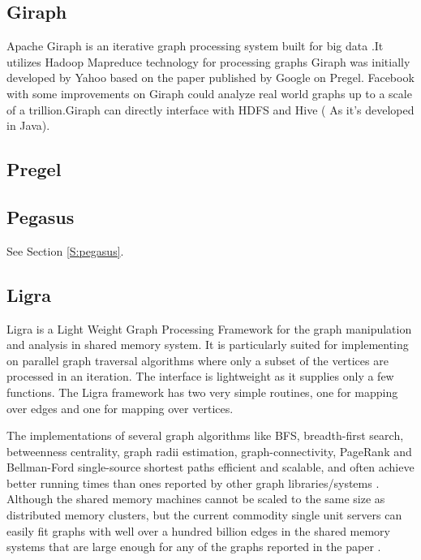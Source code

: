 \subsection{Giraph}

     Apache Giraph is an iterative graph processing system built for big
     data \cite{www-giraph-apache}.It utilizes Hadoop Mapreduce
     technology for processing graphs \cite{www-apache-giraph-wiki}
     Giraph was initially developed by Yahoo based on the paper
     published by Google on Pregel. \cite{www-apache-giraph-pcworld}
     Facebook with some improvements on Giraph could analyze real world
     graphs up to a scale of a trillion.Giraph can directly interface
     with HDFS and Hive ( As it's developed in
     Java). \cite{www-apache-giraph-fb}
   
\subsection{Pregel}
\subsection{Pegasus}

     See Section \ref{S:pegasus}.

\subsection{Ligra}

     Ligra is a Light Weight Graph Processing Framework for the graph
     manipulation and analysis in shared memory system. It is
     particularly suited for implementing on parallel graph traversal
     algorithms where only a subset of the vertices are processed in an
     iteration. The interface is lightweight as it supplies only a
     few functions. The Ligra framework has two very simple routines,
     one for mapping over edges and one for mapping over vertices.

     The implementations of several graph algorithms like BFS,
     breadth-first search, betweenness centrality, graph radii
     estimation, graph-connectivity, PageRank and Bellman-Ford
     single-source shortest paths efficient and scalable, and often
     achieve better running times than ones reported by other graph
     libraries/systems \cite{ligra-paper-2013}.  Although the shared
     memory machines cannot be scaled to the same size as distributed
     memory clusters, but the current commodity single unit servers
     can easily fit graphs with well over a hundred billion edges in
     the shared memory systems that are large enough for any of the
     graphs reported in the paper \cite{ligra-paper-2}.

